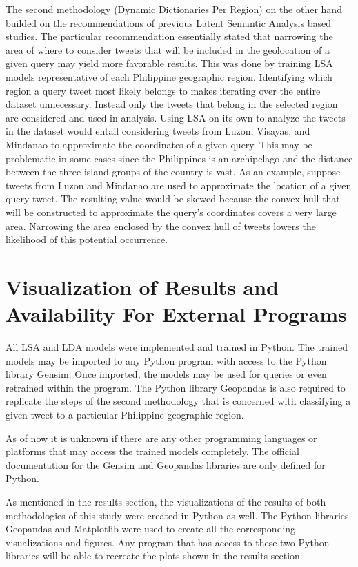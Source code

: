 The second methodology (Dynamic Dictionaries Per Region) on the other hand builded on the recommendations of previous Latent Semantic Analysis based studies. The particular recommendation essentially stated that narrowing the area of where to consider tweets that will be included in the geolocation of a given query may yield more favorable results. This was done by training LSA models representative of each Philippine geographic region. Identifying which region a query tweet most likely belongs to makes iterating over the entire dataset unnecessary. Instead only the tweets that belong in the selected region are considered and used in analysis. Using LSA on its own to analyze the tweets in the dataset would entail considering tweets from Luzon, Visayas, and Mindanao to approximate the coordinates of a given query. This may be problematic in some cases since the Philippines is an archipelago and the distance between the three island groups of the country is vast. As an example, suppose tweets from Luzon and Mindanao are used to approximate the location of a given query tweet. The resulting value would be skewed because the convex hull that will be constructed to approximate the query's coordinates covers a very large area. Narrowing the area enclosed by the convex hull of tweets lowers the likelihood of this potential occurrence. 

\section{Visualization of Results and Availability For External Programs}
All LSA and LDA models were implemented and trained in Python. The trained models may be imported to any Python program with access to the Python library Gensim. Once imported, the models may be used for queries or even retrained within the program. The Python library Geopandas is also required to replicate the steps of the second methodology that is concerned with classifying a given tweet to a particular Philippine geographic region. 

As of now it is unknown if there are any other programming languages or platforms that may access the trained models completely. The official documentation for the Gensim and Geopandas libraries are only defined for Python.

As mentioned in the results section, the visualizations of the results of both methodologies of this study were created in Python as well. The Python libraries Geopandas and Matplotlib were used to create all the corresponding visualizations and figures. Any program that has access to these two Python libraries will be able to recreate the plots shown in the results section. 

